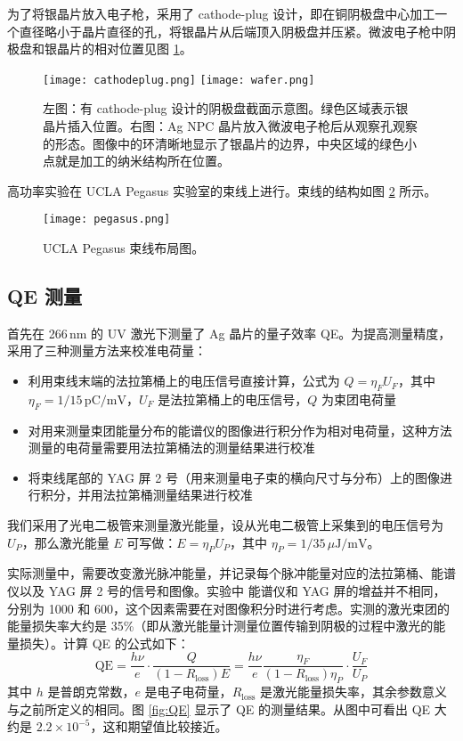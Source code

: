 为了将银晶片放入电子枪，采用了 cathode-plug 设计，即在铜阴极盘中心加工一个直径略小于晶片直径的孔，将银晶片从后端顶入阴极盘并压紧。微波电子枪中阴极盘和银晶片的相对位置见图 \ref{fig:Ag wafer}。
\begin{figure}[htbp]
\begin{center}
\texttt{[image: cathodeplug.png]}
\texttt{[image: wafer.png]}
\caption{\label{fig:Ag wafer} 
左图：有 cathode-plug 设计的阴极盘截面示意图。绿色区域表示银晶片插入位置。右图：Ag NPC 晶片放入微波电子枪后从观察孔观察的形态。图像中的环清晰地显示了银晶片的边界，中央区域的绿色小点就是加工的纳米结构所在位置。}
\end{center}
\end{figure}

高功率实验在 UCLA Pegasus 实验室的束线上进行。束线的结构如图 \ref{fig:pegasus} 所示。
\begin{figure}[htbp]
\begin{center}
\texttt{[image: pegasus.png]}
\caption{\label{fig:pegasus} UCLA Pegasus 束线布局图。}
\end{center}
\end{figure}

\subsection{QE 测量}
首先在 266\,nm 的 UV 激光下测量了 Ag 晶片的量子效率 QE。为提高测量精度，采用了三种测量方法来校准电荷量：
\begin{itemize}
\item 利用束线末端的法拉第桶上的电压信号直接计算，公式为 $Q = \eta_FU_F$，其中 $\eta_F=1/15\,\text{pC/mV}$，$U_F$ 是法拉第桶上的电压信号，$Q$ 为束团电荷量
\item 对用来测量束团能量分布的能谱仪的图像进行积分作为相对电荷量，这种方法测量的电荷量需要用法拉第桶法的测量结果进行校准
\item 将束线尾部的 YAG 屏 2 号（用来测量电子束的横向尺寸与分布）上的图像进行积分，并用法拉第桶测量结果进行校准
\end{itemize}
我们采用了光电二极管来测量激光能量，设从光电二极管上采集到的电压信号为 $U_P$，那么激光能量 $E$ 可写做：$E = \eta_PU_P$，其中 $\eta_P=1/35\,\mu\text{J/mV}$。

实际测量中，需要改变激光脉冲能量，并记录每个脉冲能量对应的法拉第桶、能谱仪以及 YAG 屏 2 号的信号和图像。实验中 能谱仪和 YAG 屏的增益并不相同，分别为 1000 和 600，这个因素需要在对图像积分时进行考虑。实测的激光束团的能量损失率大约是 35\%（即从激光能量计测量位置传输到阴极的过程中激光的能量损失）。计算 QE 的公式如下：
\begin{equation}
\label{eq:QE}
\text{QE} = \frac{h\nu}{e}\cdot\frac{Q}{(1-R_{\text{loss}})E} = \frac{h\nu}{e}\frac{\eta_F}{(1-R_{\text{loss}})\eta_P}\cdot\frac{U_F}{U_P}
\end{equation}
其中 $h$ 是普朗克常数，$e$ 是电子电荷量，$R_{\text{loss}}$ 是激光能量损失率，其余参数意义与之前所定义的相同。图 \ref{fig:QE} 显示了 QE 的测量结果。从图中可看出 QE 大约是 $2.2\times 10^{-5}$，这和期望值比较接近。

